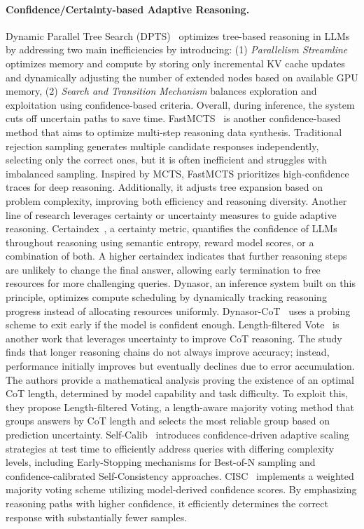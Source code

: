 \paragraph{Confidence/Certainty-based Adaptive Reasoning.}
%
Dynamic Parallel Tree Search (DPTS)~\cite{ding2025dynamic} optimizes tree-based reasoning in LLMs by addressing two main inefficiencies by introducing: (1) \textit{Parallelism Streamline} optimizes memory and compute by storing only incremental KV cache updates and dynamically adjusting the number of extended nodes based on available GPU memory, (2) \textit{Search and Transition Mechanism} balances exploration and exploitation using confidence-based criteria. Overall, during inference, the system cuts off uncertain paths to save time.
%
FastMCTS~\cite{li2025fastmcts} is another confidence-based method that aims to optimize multi-step reasoning data synthesis. Traditional rejection sampling generates multiple candidate responses independently, selecting only the correct ones, but it is often inefficient and struggles with imbalanced sampling. Inspired by MCTS, FastMCTS prioritizes high-confidence traces for deep reasoning. Additionally, it adjusts tree expansion based on problem complexity, improving both efficiency and reasoning diversity.
%
Another line of research leverages certainty or uncertainty measures to guide adaptive reasoning. Certaindex~\cite{fu2024efficiently}, a certainty metric, quantifies the confidence of LLMs throughout reasoning using semantic entropy, reward model scores, or a combination of both. A higher certaindex indicates that further reasoning steps are unlikely to change the final answer, allowing early termination to free resources for more challenging queries. Dynasor, an inference system built on this principle, optimizes compute scheduling by dynamically tracking reasoning progress instead of allocating resources uniformly. Dynasor-CoT~\cite{fu2025reasoning} uses a probing scheme to exit early if the model is confident enough.
%
Length-filtered Vote~\cite{wu2025more} is another work that leverages uncertainty to improve CoT reasoning. The study finds that longer reasoning chains do not always improve accuracy; instead, performance initially improves but eventually declines due to error accumulation. The authors provide a mathematical analysis proving the existence of an optimal CoT length, determined by model capability and task difficulty. To exploit this, they propose Length-filtered Voting, a length-aware majority voting method that groups answers by CoT length and selects the most reliable group based on prediction uncertainty.
%
Self-Calib~\cite{huang2025efficient} introduces confidence-driven adaptive scaling strategies at test time to efficiently address queries with differing complexity levels, including Early-Stopping mechanisms for Best-of-N sampling and confidence-calibrated Self-Consistency approaches.
% 
CISC~\cite{taubenfeld2025confidence} implements a weighted majority voting scheme utilizing model-derived confidence scores. By emphasizing reasoning paths with higher confidence, it efficiently determines the correct response with substantially fewer samples. 

